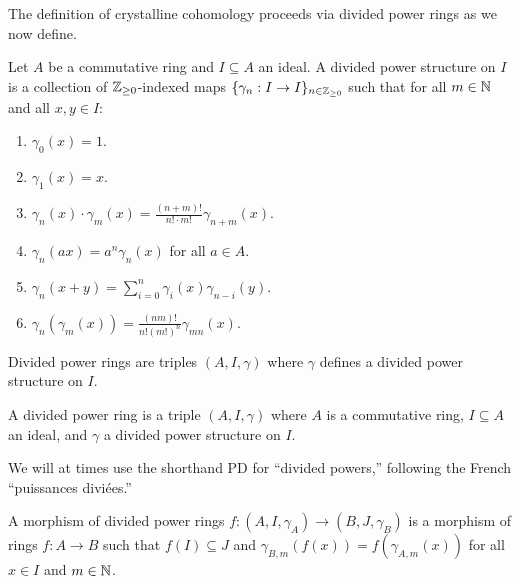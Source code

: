 The definition of crystalline cohomology proceeds via divided power rings as we now define. 
\begin{definition}\label{def: divided power structure}
    Let $A$ be a commutative ring and $I\subseteq A$ an ideal. A divided power structure on $I$ is a collection of $\mathbb{Z}_{\geq0}$-indexed maps $\{\gamma_{n}:I\to I\}_{n\in \mathbb{Z}_{\geq0}}$ such that for all $m\in\mathbb{N}$ and all $x,y\in I$:
    \begin{enumerate}[label=(\roman*)]
        \item $\gamma_{0}(x)=1$. 
        \item $\gamma_{1}(x)=x$. 
        \item $\gamma_{n}(x)\cdot\gamma_{m}(x)=\frac{(n+m)!}{n!\cdot m!}\gamma_{n+m}(x)$. 
        \item $\gamma_{n}(ax)=a^{n}\gamma_{n}(x)$ for all $a\in A$. 
        \item $\gamma_{n}(x+y)=\sum_{i=0}^{n}\gamma_{i}(x)\gamma_{n-i}(y)$. 
        \item $\gamma_{n}(\gamma_{m}(x))=\frac{(nm)!}{n!(m!)^{n}}\gamma_{mn}(x)$. 
    \end{enumerate}
\end{definition}
Divided power rings are triples $(A,I,\gamma)$ where $\gamma$ defines a divided power structure on $I$. 
\begin{definition}\label{def: divided power ring}
    A divided power ring is a triple $(A,I,\gamma)$ where $A$ is a commutative ring, $I\subseteq A$ an ideal, and $\gamma$ a divided power structure on $I$. 
\end{definition}
\begin{remark}
    We will at times use the shorthand PD for ``divided powers,'' following the French ``puissances divi\'{e}es.''
\end{remark}
A morphism of divided power rings $f:(A,I,\gamma_{A})\to (B,J,\gamma_{B})$ is a morphism of rings $f:A\to B$ such that $f(I)\subseteq J$ and $\gamma_{B,m}(f(x))=f(\gamma_{A,m}(x))$ for all $x\in I$ and $m\in\mathbb{N}$. 


